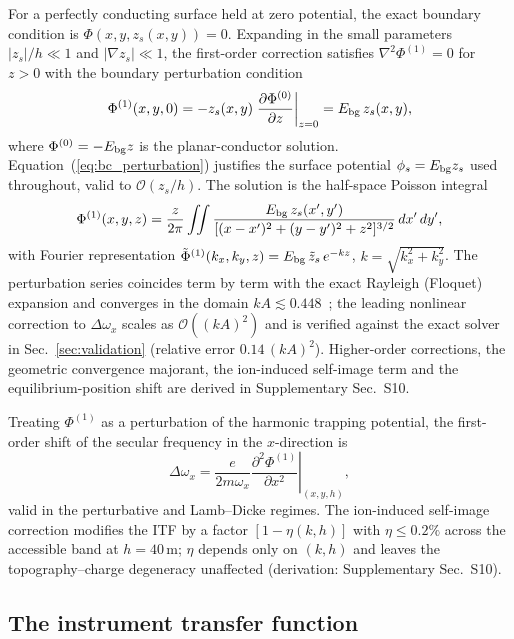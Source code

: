 \documentclass[12pt,a4paper]{article}
\begin{document}
For a perfectly conducting surface held at zero potential, the exact
boundary condition is $\Phi(x,y,z_s(x,y))=0$.  Expanding in the small
parameters $|z_s|/h\ll1$ and $|\nabla z_s|\ll1$, the first-order
correction satisfies $\nabla^2\Phi^{(1)}=0$ for $z>0$ with the boundary
perturbation condition~\cite{villarrubia1997tip}
\begin{equation}
\Phi^{(1)}(x,y,0) = -z_s(x,y)\left.\frac{\partial\Phi^{(0)}}{\partial z}\right|_{z=0}
                  = E_{\rm bg}\,z_s(x,y),
\label{eq:bc_perturbation}
\end{equation}
where $\Phi^{(0)}=-E_{\rm bg}z$ is the planar-conductor solution.
Equation~(\ref{eq:bc_perturbation}) justifies the surface potential
$\phi_s=E_{\rm bg}z_s$ used throughout, valid to $\mathcal{O}(z_s/h)$.
The solution is the half-space Poisson integral
\begin{equation}
\Phi^{(1)}(x,y,z) = \frac{z}{2\pi} \iint
    \frac{E_{\rm bg}\,z_s(x',y')}{[(x-x')^2 + (y-y')^2 + z^2]^{3/2}} \,dx'\,dy',
\label{eq:poisson}
\end{equation}
with Fourier representation
$\tilde{\Phi}^{(1)}(k_x,k_y,z)=E_{\rm bg}\,\tilde{z}_s\,e^{-kz}$,
$k=\sqrt{k_x^2+k_y^2}$.  The perturbation series coincides term by term
with the exact Rayleigh (Floquet) expansion and converges in the domain
$kA\lesssim0.448$~\cite{maystre1971rayleigh,millar1973rayleigh}; the
leading nonlinear correction to $\Delta\omega_x$ scales as
$\mathcal{O}((kA)^2)$ and is verified against the exact solver in
Sec.~\ref{sec:validation} (relative error $0.14\,(kA)^2$).  Higher-order
corrections, the geometric convergence majorant, the ion-induced
self-image term and the equilibrium-position shift are derived in
Supplementary Sec.~S10.

Treating $\Phi^{(1)}$ as a perturbation of the harmonic trapping
potential, the first-order shift of the secular frequency in the
$x$-direction is~\cite{leibfried2003review}
\begin{equation}
\Delta\omega_x = \frac{e}{2m\omega_x}
    \left.\frac{\partial^2\Phi^{(1)}}{\partial x^2}\right|_{(x,y,h)},
\label{eq:dw}
\end{equation}
valid in the perturbative and Lamb--Dicke regimes.  The ion-induced self-image correction
modifies the ITF by a factor $[1-\eta(k,h)]$ with $\eta\le0.2\%$
across the accessible band at $h=40$\,\textmu m; $\eta$ depends only on
$(k,h)$ and leaves the topography--charge degeneracy unaffected
(derivation: Supplementary Sec.~S10).

\subsection{The instrument transfer function}
\end{document}
